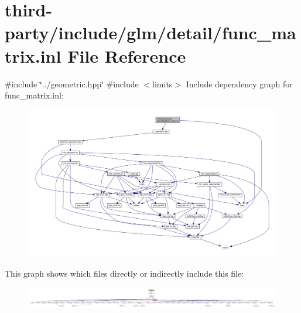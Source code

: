 \hypertarget{func__matrix_8inl}{}\section{third-\/party/include/glm/detail/func\+\_\+matrix.inl File Reference}
\label{func__matrix_8inl}
{\ttfamily \#include \char`\"{}../geometric.\+hpp\char`\"{}}\newline
{\ttfamily \#include $<$limits$>$}\newline
Include dependency graph for func\+\_\+matrix.\+inl\+:
\nopagebreak
\begin{figure}[H]
\begin{center}
\leavevmode
\includegraphics[width=350pt]{func__matrix_8inl__incl}
\end{center}
\end{figure}
This graph shows which files directly or indirectly include this file\+:
\nopagebreak
\begin{figure}[H]
\begin{center}
\leavevmode
\includegraphics[width=350pt]{func__matrix_8inl__dep__incl}
\end{center}
\end{figure}
